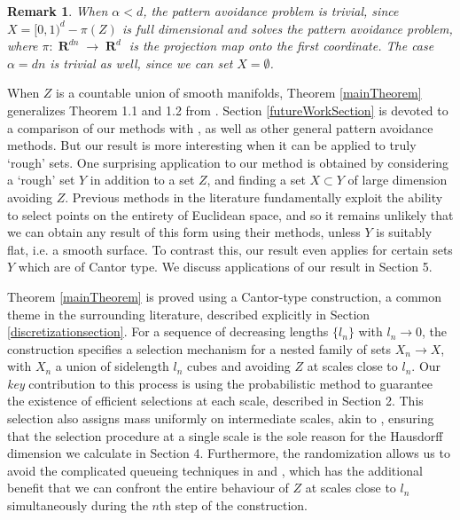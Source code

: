 \documentclass[dvipsnames,letterpaper,12pt]{article}
\numberwithin{equation}{section}
\theoremstyle{plain}
\newtheorem*{remark}{Remark}
\DeclareMathOperator{\RR}{\mathbf{R}}
\begin{document}
\begin{remark}
	When $\alpha < d$, the pattern avoidance problem is trivial, since $X = [0,1)^d - \pi(Z)$ is full dimensional and solves the pattern avoidance problem, where $\pi \colon \RR^{dn} \to \RR^d$ is the projection map onto the first coordinate. The case $\alpha = dn$ is trivial as well, since we can set $X = \emptyset$.

\end{remark}


When $Z$ is a countable union of smooth manifolds, Theorem \ref{mainTheorem} generalizes Theorem 1.1 and 1.2 from \cite{MalabikaRob}. Section \ref{futureWorkSection} is devoted to a comparison of our methods with \cite{MalabikaRob}, as well as other general pattern avoidance methods. But our result is more interesting when it can be applied to truly `rough' sets. One surprising application to our method is obtained by considering a `rough' set $Y$ in addition to a set $Z$, and finding a set $X \subset Y$ of large dimension avoiding $Z$. Previous methods in the literature fundamentally exploit the ability to select points on the entirety of Euclidean space, and so it remains unlikely that we can obtain any result of this form using their methods, unless $Y$ is suitably flat, i.e. a smooth surface. To contrast this, our result even applies for certain sets $Y$ which are of Cantor type. We discuss applications of our result in Section 5.


Theorem \ref{mainTheorem} is proved using a Cantor-type construction, a common theme in the surrounding literature, described explicitly in Section \ref{discretizationsection}. For a sequence of decreasing lengths $\{ l_n \}$ with $l_n \to 0$, the construction specifies a selection mechanism for a nested family of sets $X_n \to X$, with $X_n$ a union of sidelength $l_n$ cubes and avoiding $Z$ at scales close to $l_n$. Our {\it key} contribution to this process is using the probabilistic method to guarantee the existence of efficient selections at each scale, described in Section 2. This selection also assigns mass uniformly on intermediate scales, akin to \cite{MalabikaRob}, ensuring that the selection procedure at a single scale is the sole reason for the Hausdorff dimension we calculate in Section 4. Furthermore, the randomization allows us to avoid the complicated queueing techniques in \cite{KeletiDimOneSet} and \cite{MalabikaRob}, which has the additional benefit that we can confront the entire behaviour of $Z$ at scales close to $l_n$ simultaneously during the $n$th step of the construction.
\end{document}

